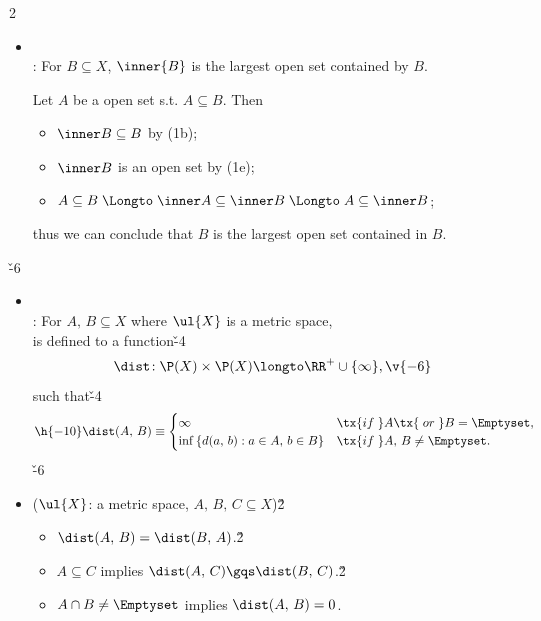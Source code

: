 \documentclass[dvipdfmx,a4paper,titlepage,9pt]{jsarticle}
\begin{document}
\begin{multicols*}{2}
\begin{itemize}[label=-]
\;

\item{}\\
: For $B\subseteq X$, $\inner{B}$ is the largest open set contained by $B$.
\begin{Pfbox}
Let $A$ be a open set s.t. $A\subseteq B$. Then
\begin{itemize}
\item[(i)] $\inner B\subseteq B$ by (1b);
\item[(ii)] $\inner B$ is an open set by (1e);
\item[(iii)] $A\subseteq B\;\Longto\;\inner A\subseteq\inner B\;\Longto\;A\subseteq\inner B$;
\end{itemize}
thus we can conclude that $B$ is the largest open set contained in $B$.
\end{Pfbox}
\end{itemize}

\newpage

\v{-6}
\begin{itemize}[label=-]
\item{} \\
: For $A,\,B\subseteq X$ where $\ul{X}$ is a metric space, \\
\;\; is defined to a function\v{-4}
$$\dist\!: \P(X)\times\P(X)\longto\RR^+\cup\{\infty\},\v{-6}$$
such that\v{-4}
$$\h{-10}\dist(A,\,B)\equiv\begin{cases}\infty & \tx{if\;}A\tx{\;or\;}B=\Emptyset,\\
                    \inf{}\{d(a,\,b):a\in A,\,b\in B\} & \tx{if\;}A,\,B\neq\Emptyset.\end{cases}$$
                    \v{-6}
                            
\item{} ($\ul{X}$: a metric space, $A,\,B,\,C\subseteq X$)\v2
\begin{itemize}
\setlength{\leftskip}{-5pt}
\item[(a)] $\dist(A,\,B)=\dist(B,\,A)$.\v2
\item[(b)] $A\subseteq C$ implies $\dist(A,\,C)\gqs\dist(B,\,C)$.\v2
\item[(c)] $A\cap B\neq\Emptyset$ implies $\dist(A,\,B)=0$.
\end{itemize}


\end{itemize}
\end{multicols*}
\end{document}
